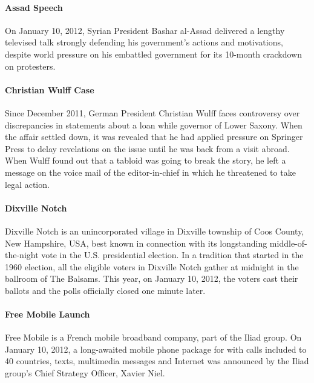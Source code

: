 \documentclass{acm_proc_article-sp}
\newcommand{\inlinelistingsize}{\fontsize{8pt}{11pt}}
\let\oldurl\url
\renewcommand{\url}[1]{\inlinelistingsize\oldurl{#1}}
\begin{document}
\paragraph{Assad Speech}
On January 10, 2012, Syrian President Bashar al-Assad delivered a lengthy televised talk strongly defending his government's actions and motivations, despite world pressure on his embattled government for its 10-month crackdown on protesters.

\paragraph{Christian Wulff Case}
Since December 2011, German President Christian Wulff faces controversy over discrepancies in statements about a loan while governor of Lower Saxony.
When the affair settled down, it was revealed that he had applied pressure on Springer Press to delay revelations on the issue until he was back from a visit abroad.
When Wulff found out that a tabloid was going to break the story, he left a message on the voice mail of the editor-in-chief in which he threatened to take legal action.

\paragraph{Dixville Notch}
Dixville Notch is an unincorporated village in Dixville township of Coos County, New Hampshire, USA, best known in connection with its longstanding middle-of-the-night vote in the U.S. presidential election.
In a tradition that started in the 1960 election, all the eligible voters in Dixville Notch gather at midnight in the ballroom of The Balsams.
This year, on January 10, 2012, the voters cast their ballots and the polls officially closed one minute later.

\paragraph{Free Mobile Launch}
Free Mobile is a French mobile broadband company, part of the Iliad group.
On January 10, 2012, a long-awaited mobile phone package for  with calls included to 40 countries, texts, multimedia messages and Internet was announced by the Iliad group's Chief Strategy Officer, Xavier Niel.
\end{document}

